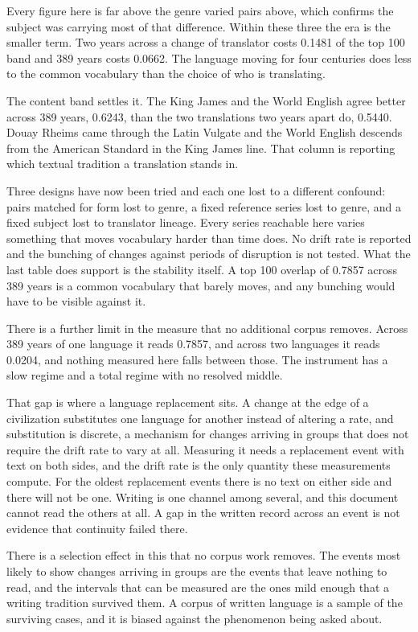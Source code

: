Every figure here is far above the genre varied pairs above, which confirms the subject was carrying most of that difference. Within these three the era is the smaller term. Two years across a change of translator costs 0.1481 of the top 100 band and 389 years costs 0.0662. The language moving for four centuries does less to the common vocabulary than the choice of who is translating.

The content band settles it. The King James and the World English agree better across 389 years, 0.6243, than the two translations two years apart do, 0.5440. Douay Rheims came through the Latin Vulgate and the World English descends from the American Standard in the King James line. That column is reporting which textual tradition a translation stands in.

Three designs have now been tried and each one lost to a different confound: pairs matched for form lost to genre, a fixed reference series lost to genre, and a fixed subject lost to translator lineage. Every series reachable here varies something that moves vocabulary harder than time does. No drift rate is reported and the bunching of changes against periods of disruption is not tested. What the last table does support is the stability itself. A top 100 overlap of 0.7857 across 389 years is a common vocabulary that barely moves, and any bunching would have to be visible against it.

There is a further limit in the measure that no additional corpus removes. Across 389 years of one language it reads 0.7857, and across two languages it reads 0.0204, and nothing measured here falls between those. The instrument has a slow regime and a total regime with no resolved middle.

That gap is where a language replacement sits. A change at the edge of a civilization substitutes one language for another instead of altering a rate, and substitution is discrete, a mechanism for changes arriving in groups that does not require the drift rate to vary at all. Measuring it needs a replacement event with text on both sides, and the drift rate is the only quantity these measurements compute. For the oldest replacement events there is no text on either side and there will not be one. Writing is one channel among several, and this document cannot read the others at all. A gap in the written record across an event is not evidence that continuity failed there.

There is a selection effect in this that no corpus work removes. The events most likely to show changes arriving in groups are the events that leave nothing to read, and the intervals that can be measured are the ones mild enough that a writing tradition survived them. A corpus of written language is a sample of the surviving cases, and it is biased against the phenomenon being asked about.

